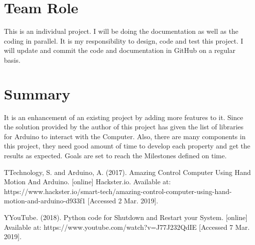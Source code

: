 \documentclass[journal]{IEEEtran}
\begin{document}
\section{Team Role}
This is an individual project. I will be doing the documentation as well as the coding in parallel. It is my responsibility to design, code and test this project. I will update and commit the code and documentation in GitHub on a regular basis.

\section{Summary}
 It is an enhancement of an existing project by adding more features to it. Since the solution provided by the author of this project has given the list of libraries for Arduino to interact with the Computer. Also, there are many components in this project, they need good amount of time to develop each property and get the results as expected. Goals are set to reach the Milestones defined on time. %


%
%
%
\begin{thebibliography}{1}

\bibitem
 TTechnology, S. and Arduino, A. (2017). Amazing Control Computer Using Hand Motion And Arduino. [online] Hackster.io. Available at: https://www.hackster.io/smart-tech/amazing-control-computer-using-hand-motion-and-arduino-d933f1 [Accessed 2 Mar. 2019].

\bibitem
YYouTube. (2018). Python code for Shutdown and Restart your System. [online] Available at: https://www.youtube.com/watch?v=J77J232QdIE [Accessed 7 Mar. 2019].
\end{thebibliography}


\end{document}
